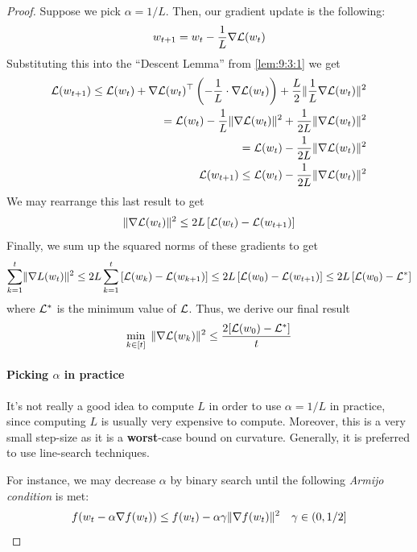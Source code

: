 \begin{proof}
Suppose we pick $\alpha = 1/L$. Then, our gradient update is the following:
\begin{align*}
    w_{t+1} = w_t - \frac{1}{L}\nabla \mathcal{L}(w_t)
\end{align*}
Substituting this into the ``Descent Lemma'' from \ref{lem:9:3:1} we get
\begin{align*}
    \mathcal{L}(w_{t+1}) \leq \mathcal{L}(w_t) + \nabla \mathcal{L}(w_t)^\top \left( -\frac{1}{L} \cdot \nabla \mathcal{L}(w_t)\right) + \frac{L}{2} \lVert \frac{1}{L} \nabla \mathcal{L}(w_t) \rVert^2 \\
    = \mathcal{L}(w_t) - \frac{1}{L}\lVert \nabla\mathcal{L}(w_t) \rVert^2 + \frac{1}{2L} \lVert \nabla \mathcal{L}(w_t) \rVert^2 \\
    = \mathcal{L}(w_t) - \frac{1}{2L}\lVert \nabla \mathcal{L}(w_t) \rVert^2 \\
    \mathcal{L}(w_{t+1}) \leq \mathcal{L}(w_t) - \frac{1}{2L}\lVert \nabla\mathcal{L}(w_t) \rVert^2
\end{align*}
We may rearrange this last result to get
\begin{align*}
    \lVert \nabla \mathcal{L}(w_t) \rVert^2 \leq 2L\left[\mathcal{L}(w_t) - \mathcal{L}(w_{t+1})\right]
\end{align*}
Finally, we sum up the squared norms of these gradients to get
\begin{align*}
    \sum_{k = 1}^t \lVert \nabla L(w_t) \rVert^2 \leq 2L \sum_{k = 1}^t\left[\mathcal{L}(w_k) - \mathcal{L}(w_{k+1})\right] 
    \leq 2L\left[\mathcal{L}(w_0) - \mathcal{L}(w_{t+1})\right] \leq 2L\left[\mathcal{L}(w_0) - \mathcal{L}^*\right]
\end{align*}
where $\mathcal{L}^*$ is the minimum value of $\mathcal{L}$. Thus, we derive our final result
\begin{align*}
        \min_{k \in [t]}{\; \lVert \nabla \mathcal{L}(w_k) \rVert^2} \leq \frac{2[\mathcal{L}(w_0) - \mathcal{L}^*]}{t}
\end{align*}

\paragraph{Picking $\alpha$ in practice}
It's not really a good idea to compute $L$ in order to use $\alpha = 1/L$ in practice, since computing $L$ is usually very expensive to compute. Moreover, this is a very small step-size as it is a \textbf{worst}-case bound on curvature. Generally, it is preferred to use line-search techniques.

For instance, we may decrease $\alpha$ by binary search until the following {\em Armijo condition} is met:
\begin{align*}
    f(w_t - \alpha\nabla f(w_t)) \leq f(w_t) - \alpha\gamma\lVert \nabla f(w_t) \rVert^2  \quad \gamma \in (0, 1/2]
\end{align*}
\end{proof}

